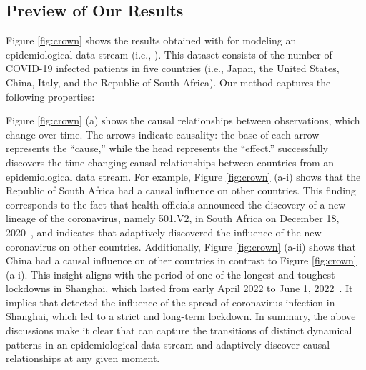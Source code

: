 \subsection{Preview of Our Results}
Figure \ref{fig:crown} shows the results obtained with \method
for modeling an epidemiological data stream (i.e., \covid).
This dataset consists of the number of COVID-19 infected patients in five countries (i.e., Japan, the United States, China, Italy, and the Republic of South Africa).
Our method captures the following properties: \par
\par
\myparaitemize{\Relation}
Figure \ref{fig:crown} (a) shows
the causal relationships
between observations, which change over time.
The arrows indicate causality:
the base of each arrow represents the ``cause,''
while the head represents the ``effect.''
\method successfully discovers the time-changing causal relationships between countries from an epidemiological data stream.
For example,
Figure \ref{fig:crown} (a-i) shows that the Republic of South Africa had a causal influence on other countries.
This finding corresponds to the fact that
health officials announced the discovery of a new lineage of the coronavirus, namely 501.V2, in South Africa on December 18, 2020~\cite{covid19_africa},
and indicates that \method adaptively discovered the influence of the new coronavirus on other countries.
Additionally, Figure \ref{fig:crown} (a-ii) shows that China had a causal influence on other countries in contrast to Figure \ref{fig:crown} (a-i).
This insight aligns with the period of one of the longest and toughest lockdowns in Shanghai, which lasted from early April 2022 to June 1, 2022~\cite{covid19_china}.
It implies that
\method detected the influence of the spread of coronavirus infection in Shanghai,
which led to a strict and long-term lockdown.
In summary, the above discussions make it clear that
\method can capture the transitions of distinct dynamical patterns in an epidemiological data stream and
adaptively discover causal relationships at any given moment.
\par

